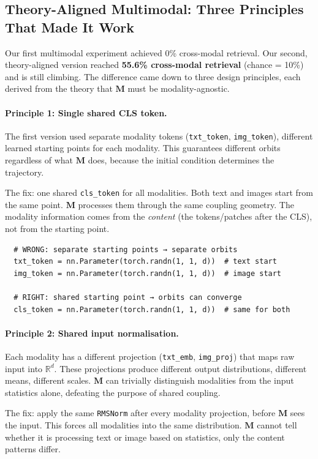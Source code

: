 \documentclass[11pt, a4paper]{article}
\newcommand{\M}{\mathbf{M}}
\newcommand{\R}{\mathbb{R}}
\theoremstyle{remark}
\begin{document}
\subsection{Theory-Aligned Multimodal: Three Principles That Made It Work}

Our first multimodal experiment achieved 0\% cross-modal retrieval.
Our second, theory-aligned version reached \textbf{55.6\% cross-modal retrieval} (chance = 10\%) and is still climbing.
The difference came down to three design principles, each derived from the theory that $\M$ must be modality-agnostic.

\paragraph{Principle 1: Single shared CLS token.}
The first version used separate modality tokens (\texttt{txt\_token}, \texttt{img\_token}), different learned starting points for each modality.
This guarantees different orbits regardless of what $\M$ does, because the initial condition determines the trajectory.

The fix: one shared \texttt{cls\_token} for all modalities.
Both text and images start from the same point.
$\M$ processes them through the same coupling geometry.
The modality information comes from the \emph{content} (the tokens/patches after the CLS), not from the starting point.

\begin{verbatim}
  # WRONG: separate starting points → separate orbits
  txt_token = nn.Parameter(torch.randn(1, 1, d))  # text start
  img_token = nn.Parameter(torch.randn(1, 1, d))  # image start

  # RIGHT: shared starting point → orbits can converge
  cls_token = nn.Parameter(torch.randn(1, 1, d))  # same for both
\end{verbatim}

\paragraph{Principle 2: Shared input normalisation.}
Each modality has a different projection (\texttt{txt\_emb}, \texttt{img\_proj}) that maps raw input into $\R^d$.
These projections produce different output distributions, different means, different scales.
$\M$ can trivially distinguish modalities from the input statistics alone, defeating the purpose of shared coupling.

The fix: apply the same \texttt{RMSNorm} after every modality projection, before $\M$ sees the input.
This forces all modalities into the same distribution.
$\M$ cannot tell whether it is processing text or image based on statistics, only the content patterns differ.
\end{document}
